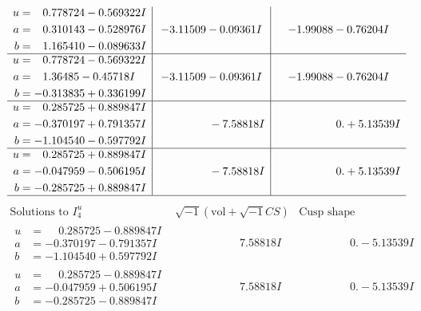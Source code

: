 \documentclass[1p]{elsarticle_modified}
\theoremstyle{definition}
\newcommand{\I}{\sqrt{-1}}
\begin{document}
$$\begin{array}{c|c|c}
\begin{aligned}
u &= \phantom{-}0.778724 - 0.569322 I \\
a &= \phantom{-}0.310143 - 0.528976 I \\
b &= \phantom{-}1.165410 - 0.089633 I\end{aligned}
 & -3.11509 - 0.09361 I & -1.99088 - 0.76204 I \\ \hline\begin{aligned}
u &= \phantom{-}0.778724 - 0.569322 I \\
a &= \phantom{-}1.36485 - 0.45718 I \\
b &= -0.313835 + 0.336199 I\end{aligned}
 & -3.11509 - 0.09361 I & -1.99088 - 0.76204 I \\ \hline\begin{aligned}
u &= \phantom{-}0.285725 + 0.889847 I \\
a &= -0.370197 + 0.791357 I \\
b &= -1.104540 - 0.597792 I\end{aligned}
 & \phantom{-0.000000 } -7.58818 I & \phantom{-0.000000 -}0. + 5.13539 I \\ \hline\begin{aligned}
u &= \phantom{-}0.285725 + 0.889847 I \\
a &= -0.047959 - 0.506195 I \\
b &= -0.285725 + 0.889847 I\end{aligned}
 & \phantom{-0.000000 } -7.58818 I & \phantom{-0.000000 -}0. + 5.13539 I\\
 \hline 
 \end{array}$$\newpage$$\begin{array}{c|c|c}  
\text{Solutions to }I^u_{4}& \I (\text{vol} + \sqrt{-1}CS) & \text{Cusp shape}\\
 \hline 
\begin{aligned}
u &= \phantom{-}0.285725 - 0.889847 I \\
a &= -0.370197 - 0.791357 I \\
b &= -1.104540 + 0.597792 I\end{aligned}
 & \phantom{-0.000000 -}7.58818 I & \phantom{-0.000000 } 0. - 5.13539 I \\ \hline\begin{aligned}
u &= \phantom{-}0.285725 - 0.889847 I \\
a &= -0.047959 + 0.506195 I \\
b &= -0.285725 - 0.889847 I\end{aligned}
 & \phantom{-0.000000 -}7.58818 I & \phantom{-0.000000 } 0. - 5.13539 I \\ \hline\begin{aligned}

\end{aligned}
\end{array}$$
\end{document}
